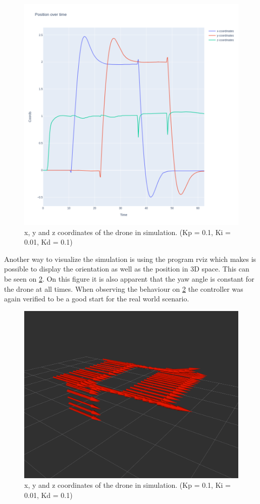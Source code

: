 \documentclass[conference]{IEEEtran}
\begin{document}
\begin{figure}[hbtp]
	\centering
	\includegraphics[width=1.0\linewidth]{images/task2_sim_pos.png}
	\caption{x, y and z coordinates of the drone in simulation. (Kp = 0.1, Ki = 0.01, Kd = 0.1)}
	\label{fig:sim_pos}
\end{figure}

Another way to visualize the simulation is using the program rviz which makes is possible to display the orientation as well as the position in 3D space. This can be seen on \cref{fig:sim_rviz}. On this figure it is also apparent that the yaw angle is constant for the drone at all times. When observing the behaviour on \cref{fig:sim_rviz} the controller was again verified to be a good start for the real world scenario.

\begin{figure}[hbtp]
	\centering
	\includegraphics[width=1.0\linewidth]{images/task2_sim_rviz.png}
	\caption{x, y and z coordinates of the drone in simulation. (Kp = 0.1, Ki = 0.01, Kd = 0.1)}
	\label{fig:sim_rviz}
\end{figure}
\end{document}
